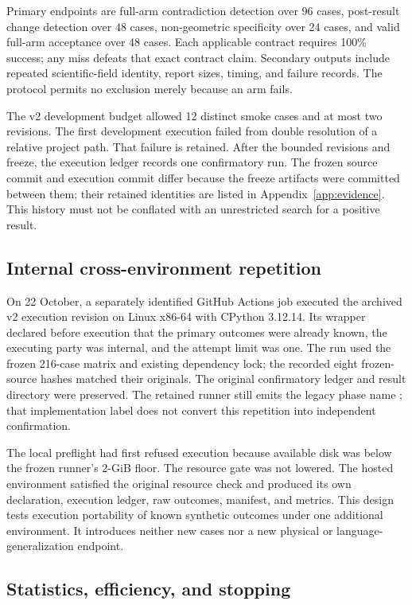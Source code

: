 \documentclass[10pt]{article}
\newcommand{\code}[1]{\texttt{\detokenize{#1}}}
\begin{document}
Primary endpoints are full-arm contradiction detection over 96 cases,
post-result change detection over 48 cases, non-geometric specificity over
24 cases, and valid full-arm acceptance over 48 cases. Each applicable
contract requires 100\% success; any miss defeats that exact contract claim.
Secondary outputs include repeated scientific-field identity, report sizes,
timing, and failure records. The protocol permits no exclusion merely because
an arm fails.

The v2 development budget allowed 12 distinct smoke cases and at most two
revisions. The first development execution failed from double resolution
of a relative project path. That failure is retained. After the bounded
revisions and freeze, the execution ledger records one confirmatory run.
The frozen source commit and execution commit differ because the freeze
artifacts were committed between them; their retained identities are listed
in Appendix~\ref{app:evidence}. This history must not be conflated with an
unrestricted search for a positive result.

\subsection{Internal cross-environment repetition}

On 22 October, a separately identified GitHub Actions job executed the
archived v2 execution revision on Linux x86-64 with CPython 3.12.14. Its
wrapper declared before execution that the primary outcomes were already
known, the executing party was internal, and the attempt limit was one.
The run used the frozen 216-case matrix and existing dependency lock; the
recorded eight frozen-source hashes matched their originals. The original
confirmatory ledger and result directory were preserved. The retained runner
still emits the legacy phase name \code{confirmatory}; that implementation
label does not convert this repetition into independent confirmation.

The local preflight had first refused execution because available disk was
below the frozen runner's 2-GiB floor. The resource gate was not lowered.
The hosted environment satisfied the original resource check and produced
its own declaration, execution ledger, raw outcomes, manifest, and metrics.
This design tests execution portability of known synthetic outcomes under
one additional environment. It introduces neither new cases nor a new
physical or language-generalization endpoint.

\subsection{Statistics, efficiency, and stopping}
\end{document}
